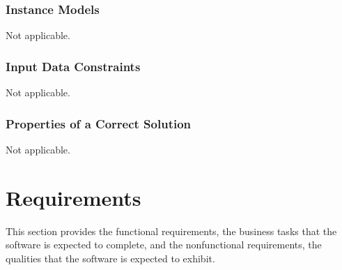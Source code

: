 \documentclass[12pt]{article}
\begin{document}
\subsubsection{Instance Models} \label{sec_instance}    
Not applicable.

\subsubsection{Input Data Constraints} \label{sec_DataConstraints}    
Not applicable.

\subsubsection{Properties of a Correct Solution} \label{sec_CorrectSolution} Not
applicable.


\newpage


\section{Requirements}


This section provides the functional requirements, the business tasks that the
software is expected to complete, and the nonfunctional requirements, the
qualities that the software is expected to exhibit.
\end{document}
